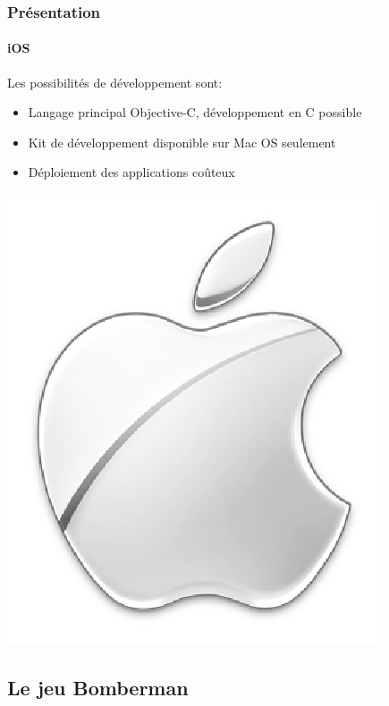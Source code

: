 \begin{frame}
\frametitle{Présentation}
\framesubtitle{iOS}
	\begin{minipage}{8cm}
	Les possibilités de développement sont: \\ 

	\begin{itemize}
		\item Langage principal Objective-C, développement en C possible
		\item Kit de développement disponible sur Mac OS seulement
		\item Déploiement des applications coûteux
	\end{itemize}
	\end{minipage}  \includegraphics[scale=0.2]{img/apple.png} 
\end{frame}


 
\subsection{Le jeu Bomberman}


